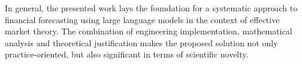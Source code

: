 In general, the presented work lays the foundation for a systematic approach to financial forecasting
using large language models in the context of effective market theory. The combination of engineering
implementation, mathematical analysis and theoretical justification makes the proposed solution not only
practice-oriented, but also significant in terms of scientific novelty.
